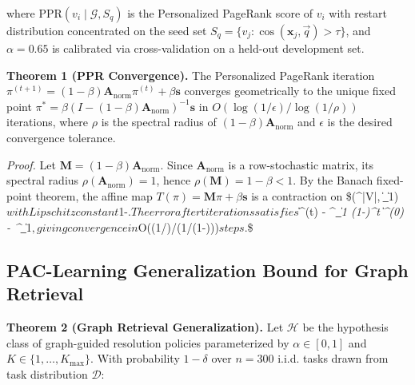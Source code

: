 \documentclass[10pt,twocolumn,letterpaper]{article}
\begin{document}
where $\text{PPR}(v_i \mid \mathcal{G}, S_q)$ is the Personalized PageRank score of $v_i$ with restart distribution concentrated on the seed set $S_q = \{v_j : \cos(\mathbf{x}_j, \vec{q}) > \tau\}$, and $\alpha = 0.65$ is calibrated via cross-validation on a held-out development set.

\textbf{Theorem 1 (PPR Convergence).} The Personalized PageRank iteration $\pi^{(t+1)} = (1-\beta) \mathbf{A}_{\text{norm}} \pi^{(t)} + \beta \mathbf{s}$ converges geometrically to the unique fixed point $\pi^* = \beta(I - (1-\beta)\mathbf{A}_{\text{norm}})^{-1}\mathbf{s}$ in $O(\log(1/\epsilon) / \log(1/\rho))$ iterations, where $\rho$ is the spectral radius of $(1-\beta)\mathbf{A}_{\text{norm}}$ and $\epsilon$ is the desired convergence tolerance.

\textit{Proof.} Let $\mathbf{M} = (1-\beta)\mathbf{A}_{\text{norm}}$. Since $\mathbf{A}_{\text{norm}}$ is a row-stochastic matrix, its spectral radius $\rho(\mathbf{A}_{\text{norm}}) = 1$, hence $\rho(\mathbf{M}) = 1-\beta < 1$. By the Banach fixed-point theorem, the affine map $T(\pi) = \mathbf{M}\pi + \beta\mathbf{s}$ is a contraction on \$(^{|V|}, \|\cdot\|\_1)$ with Lipschitz constant $1-\beta$. The error after $t$ iterations satisfies $\|\pi^{(t)} - \pi^\textit{\|\_1 \leq (1-\beta)^t \|\pi^{(0)} - \pi^}\|\_1$, giving convergence in $O(\log(1/\epsilon)/\log(1/(1-\beta)))$ steps. $\square\$


\subsection{PAC-Learning Generalization Bound for Graph Retrieval}


\textbf{Theorem 2 (Graph Retrieval Generalization).} Let $\mathcal{H}$ be the hypothesis class of graph-guided resolution policies parameterized by $\alpha \in [0,1]$ and $K \in \{1,\ldots,K_{\max}\}$. With probability $1-\delta$ over $n = 300$ i.i.d. tasks drawn from task distribution $\mathcal{D}$:
\end{document}
